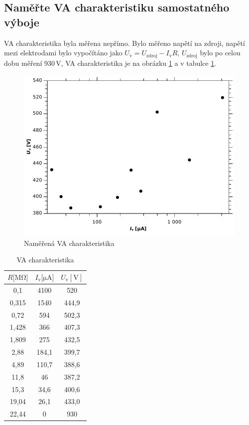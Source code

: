 \documentclass[12pt]{article}
\begin{document}
\subsection{Naměřte VA charakteristiku samostatného výboje}
VA charakteristika byla měřena nepřímo. Bylo měřeno napětí na zdroji, napětí mezi elektrodami bylo vypočítáno jako $U_\mathrm{v} = U_\mathrm{zdroj} - I_\mathrm{v}R$, $U_\mathrm{zdroj}$ bylo po celou dobu měření 930\,V, VA charakteristika je na obrázku \ref{graph3} a v tabulce \ref{VA2}.

\begin{figure}[htbp]
\begin{center}
\includegraphics[width=12cm]{Graph3.pdf}
\caption{Naměřená VA charakteristika}
\label{graph3}
\end{center}
\end{figure}

\begin{table}[htbp]
\begin{center}
\begin{tabular}{|c|c|c|}
\hline
{$R [\mathrm{M\Omega]}$} & {$I_\mathrm{v} [\mathrm{\mu A]}$} & {$U_\mathrm{v} \mathrm{[V]}$} \\ \hline
0,1 & 4100 & 520 \\ \hline
0,315 & 1540 & 444,9 \\ \hline
0,72 & 594 & 502,3 \\ \hline
1,428 & 366 & 407,3 \\ \hline
1,809 & 275 & 432,5 \\ \hline
2,88 & 184,1 & 399,7 \\ \hline
4,89 & 110,7 & 388,6 \\ \hline
11,8 & 46 & 387,2 \\ \hline
15,3 & 34,6 & 400,6 \\ \hline
19,04 & 26,1 & 433,0 \\ \hline
22,44 & 0 & 930 \\ \hline
\end{tabular}
\caption{VA charakteristika}
\label{VA2}
\end{center}
\end{table}
\end{document}
